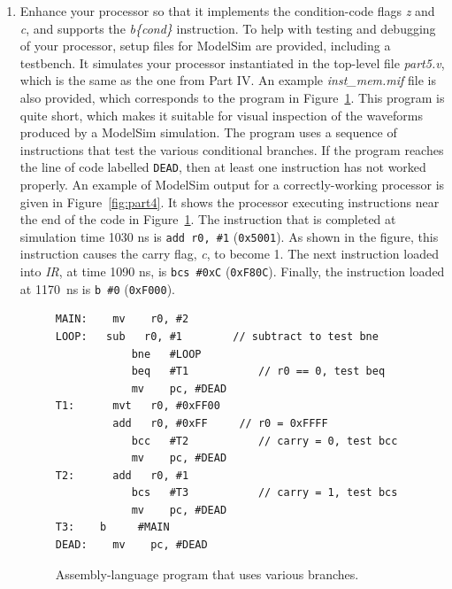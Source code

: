 \documentclass[epsfig,10pt,fullpage]{article}
\begin{document}
\begin{enumerate}
\item 
Enhance your processor so that it implements the condition-code flags {\it z} and {\it c},
and supports the {\it b\{cond\}} instruction. 
To help with testing and debugging of your processor, setup files for ModelSim are provided, 
including a testbench. It simulates your processor instantiated in the top-level file
{\it part5.v}, which is the same as the one from Part IV. 
An example {\it inst\_mem.mif} file is also provided, which corresponds 
to the program in Figure~\ref{fig:branches}. This program is quite short, 
which makes it suitable for visual inspection of the waveforms produced by a ModelSim simulation. 
The program uses a sequence of instructions that test the various conditional branches. 
If the program reaches the line of code labelled \texttt{DEAD}, then at least one 
instruction has not worked properly. An example of ModelSim output for a correctly-working
processor is given in Figure~\ref{fig:part4}. It shows the processor executing instructions
near the end of the code in Figure~\ref{fig:branches}. The instruction that is completed
at simulation time 1030 ns is \texttt{add r0, \#1} (\texttt{0x5001}). As shown in the figure,
this instruction causes the carry flag, {\it c}, to become 1. The next instruction loaded
into {\it IR}, at time 1090 ns, is \texttt{bcs \#0xC} (\texttt{0xF80C}). Finally, the
instruction loaded at 1170~ns is \texttt{b~\#0} (\texttt{0xF000}). 

\lstset{language=ASM,numbers=none,escapechar=|}
\begin{figure}[H]
\begin{center}
\begin{minipage}[h]{13.5 cm}
\begin{lstlisting}[name=proc]
MAIN:    mv    r0, #2
LOOP: 	sub   r0, #1        // subtract to test bne
			bne   #LOOP
			beq   #T1           // r0 == 0, test beq
			mv    pc, #DEAD
T1:      mvt   r0, #0xFF00
         add   r0, #0xFF     // r0 = 0xFFFF
			bcc   #T2           // carry = 0, test bcc
			mv    pc, #DEAD
T2:      add   r0, #1
			bcs   #T3           // carry = 1, test bcs
			mv    pc, #DEAD
T3:	   b     #MAIN
DEAD:    mv    pc, #DEAD
\end{lstlisting}
\end{minipage}
\caption{Assembly-language program that uses various branches.}
\label{fig:branches}
\end{center}
\end{figure}


\end{enumerate}
\end{document}
